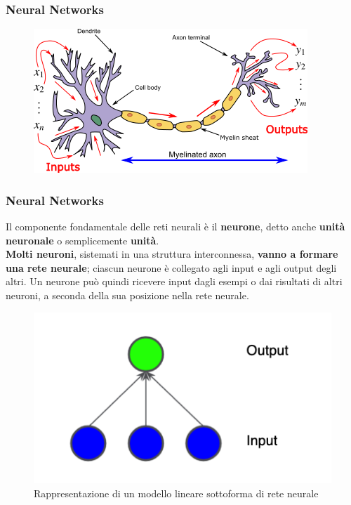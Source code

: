 \begin{frame}

	\frametitle{Neural Networks}

	\begin{figure}[!htbp]
		\centering
		\includegraphics[width=0.90\linewidth]{images/supervised/z_algorithms_neural_networks/neuron.png}
	\end{figure}

\end{frame}


\begin{frame}

	\frametitle{Neural Networks}

	Il componente fondamentale delle reti neurali è il \textbf{neurone}, detto anche \textbf{unità neuronale} o semplicemente \textbf{unità}.\\
	\textbf{Molti neuroni}, sistemati in una struttura interconnessa, \textbf{vanno a formare una rete neurale}; ciascun neurone è collegato agli input e agli output degli altri. Un neurone può quindi ricevere input dagli esempi o dai risultati di altri neuroni, a seconda della sua posizione nella rete neurale.
	\begin{figure}[!htbp]
		\centering
		\includegraphics[width=0.45\linewidth]{images/supervised/z_algorithms_neural_networks/linear_net.png}
		\caption{Rappresentazione di un modello lineare sottoforma di rete neurale}
	\end{figure}
\end{frame}


